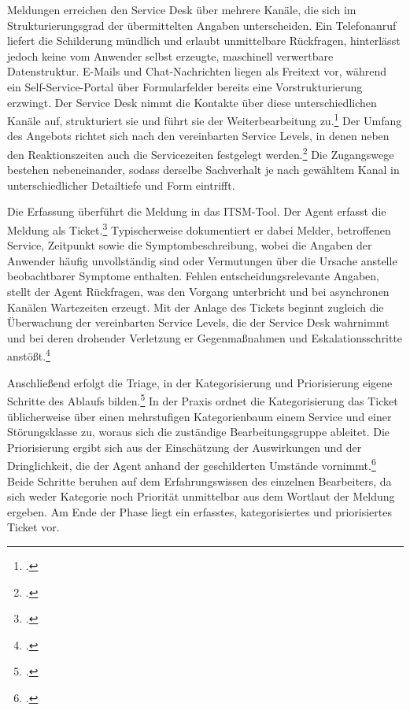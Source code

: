 Meldungen erreichen den Service Desk \"uber mehrere Kan\"ale, die sich im Strukturierungsgrad der \"ubermittelten Angaben unterscheiden. Ein Telefonanruf liefert die Schilderung m\"undlich und erlaubt unmittelbare R\"uckfragen, hinterl\"asst jedoch keine vom Anwender selbst erzeugte, maschinell verwertbare Datenstruktur. E-Mails und Chat-Nachrichten liegen als Freitext vor, w\"ahrend ein Self-Service-Portal \"uber Formularfelder bereits eine Vorstrukturierung erzwingt. Der Service Desk nimmt die Kontakte \"uber diese unterschiedlichen Kan\"ale auf, strukturiert sie und f\"uhrt sie der Weiterbearbeitung zu.\footcite[Vgl.][S.~450]{Tiemeyer2020} Der Umfang des Angebots richtet sich nach den vereinbarten Service Levels, in denen neben den Reaktionszeiten auch die Servicezeiten festgelegt werden.\footcite[Vgl.][S.~425]{Tiemeyer2020} Die Zugangswege bestehen nebeneinander, sodass derselbe Sachverhalt je nach gew\"ahltem Kanal in unterschiedlicher Detailtiefe und Form eintrifft.

Die Erfassung \"uberf\"uhrt die Meldung in das ITSM-Tool. Der Agent erfasst die Meldung als Ticket.\footcite[Vgl.][S.~448]{Tiemeyer2020} Typischerweise dokumentiert er dabei Melder, betroffenen Service, Zeitpunkt sowie die Symptombeschreibung, wobei die Angaben der Anwender h\"aufig unvollst\"andig sind oder Vermutungen \"uber die Ursache anstelle beobachtbarer Symptome enthalten. Fehlen entscheidungsrelevante Angaben, stellt der Agent R\"uckfragen, was den Vorgang unterbricht und bei asynchronen Kan\"alen Wartezeiten erzeugt. Mit der Anlage des Tickets beginnt zugleich die \"Uberwachung der vereinbarten Service Levels, die der Service Desk wahrnimmt und bei deren drohender Verletzung er Gegenma{\ss}nahmen und Eskalationsschritte anst\"o{\ss}t.\footcite[Vgl.][S.~450]{Tiemeyer2020}

Anschlie{\ss}end erfolgt die Triage, in der Kategorisierung und Priorisierung eigene Schritte des Ablaufs bilden.\footcite[Vgl.][S.~448]{Tiemeyer2020} In der Praxis ordnet die Kategorisierung das Ticket \"ublicherweise \"uber einen mehrstufigen Kategorienbaum einem Service und einer St\"orungsklasse zu, woraus sich die zust\"andige Bearbeitungsgruppe ableitet. Die Priorisierung ergibt sich aus der Einsch\"atzung der Auswirkungen und der Dringlichkeit, die der Agent anhand der geschilderten Umst\"ande vornimmt.\footcite[Vgl.][S.~509]{Tiemeyer2020b} Beide Schritte beruhen auf dem Erfahrungswissen des einzelnen Bearbeiters, da sich weder Kategorie noch Priorit\"at unmittelbar aus dem Wortlaut der Meldung ergeben. Am Ende der Phase liegt ein erfasstes, kategorisiertes und priorisiertes Ticket vor.

